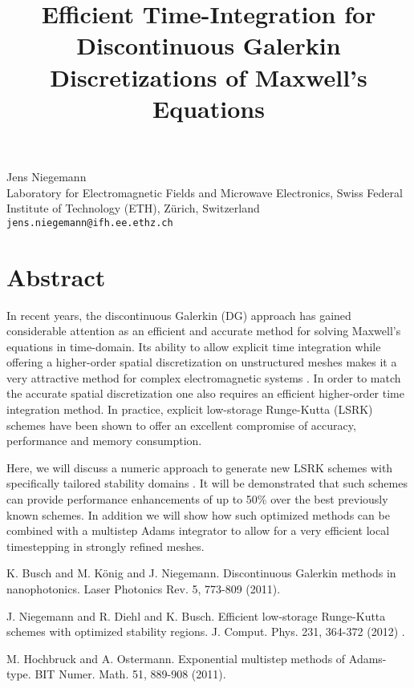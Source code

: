 \title{Efficient Time-Integration for Discontinuous Galerkin Discretizations of Maxwell's Equations}
 \author{} \institute{}
\maketitle
\begin{center}
{\large Jens Niegemann}\\
Laboratory for Electromagnetic Fields and Microwave Electronics, Swiss Federal Institute of Technology (ETH), Z\"urich, Switzerland\\
{\tt jens.niegemann@ifh.ee.ethz.ch}

\end{center}

\section*{Abstract}

In recent years, the discontinuous Galerkin (DG) approach has gained considerable attention as an efficient and accurate method for solving Maxwell's equations in time-domain. Its ability to allow explicit time integration while offering a higher-order spatial discretization on unstructured meshes makes it a very attractive method for complex electromagnetic systems \cite{Koenig11}. In order to match the accurate spatial discretization one also requires an efficient higher-order time integration
method. In practice, explicit low-storage Runge-Kutta (LSRK) schemes have been shown to offer an excellent compromise of accuracy, performance and memory consumption.

Here, we will discuss a numeric approach to generate new LSRK schemes with specifically tailored stability domains \cite{Niegemann12}. It will be demonstrated that such schemes can provide performance enhancements of up to 50\% over the best previously known schemes. In addition we will show how such optimized methods can be combined with a multistep Adams integrator \cite{Hochbruck11} to allow for a very efficient local timestepping in strongly refined meshes.


\begin{thebibliography}{10}

{\sc K. Busch and M. K\"onig and J. Niegemann}. {Discontinuous Galerkin methods in nanophotonics}. Laser Photonics Rev. 5, 773-809 (2011).



{\sc J. Niegemann and R. Diehl and K. Busch}. {Efficient low-storage Runge-Kutta schemes with optimized stability regions}. J. Comput. Phys. 231, 364-372 (2012) .



{\sc M. Hochbruck and A. Ostermann}. {Exponential multistep methods of Adams-type}. BIT Numer. Math. 51, 889-908 (2011).

\end{thebibliography}
